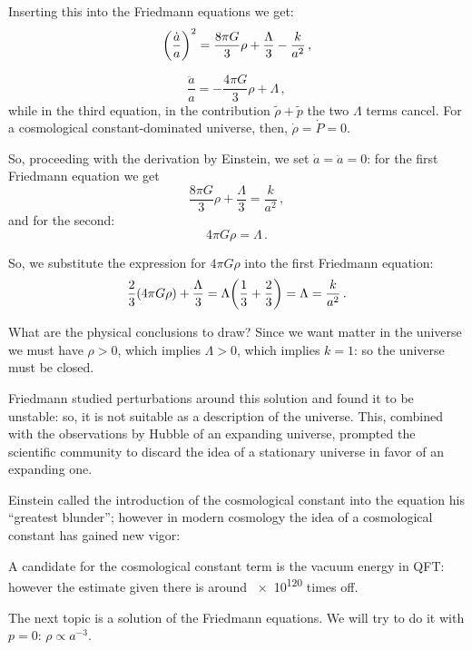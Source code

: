 \documentclass[main.tex]{subfiles}
\begin{document}
Inserting this into the Friedmann equations we get: 
%
\begin{equation}
  \qty(\frac{\dot{a} }{a})^2= 
  \frac{8 \pi G}{3} \rho + \frac{\Lambda }{3}
  - \frac{k}{a^2}
\,,
\end{equation}
%

%
\begin{equation}
  \frac{\ddot{a}}{a} = - \frac{4 \pi G}{3} \rho + \Lambda 
\,,
\end{equation}
%
while in the third equation, in the contribution \(\widetilde{\rho }  + \widetilde{p} \) the two \(\Lambda \) terms cancel. For a cosmological constant-dominated universe, then, \(\dot{\rho} = \dot{P} = 0\). 

So, proceeding with the derivation by Einstein, we set \(\dot{a}= \ddot{a} =0 \): for the first Friedmann equation we get 
%
\begin{equation}
  \frac{8 \pi G}{3} \rho + \frac{\Lambda}{3} = \frac{k}{a^2}
\,,
\end{equation}
%
and for the second: 
%
\begin{equation}
  4 \pi G \rho = \Lambda 
\,.
\end{equation}

So, we substitute the expression for \(4 \pi G \rho \) into the first Friedmann equation: 
%
\begin{equation}
  \frac{2}{3} \qty(4 \pi G \rho ) + \frac{\Lambda}{3} =
  \Lambda \qty(\frac{1}{3}+ \frac{2}{3}) = \Lambda = \frac{k}{a^2}
\,.
\end{equation}

What are the physical conclusions to draw? 
Since we want matter in the universe we must have \(\rho >0\), which implies \(\Lambda >0\), which implies \(k =1\): so the universe must be closed. 

Friedmann studied perturbations around this solution and found it to be unstable: so, it is not suitable as a description of the universe.
This, combined with the observations by Hubble of an expanding universe, prompted the scientific community to discard the idea of a stationary universe in favor of an expanding one.

Einstein called \cite{autInvestigatingLegendEinstein2018} the introduction of the cosmological constant into the equation his ``greatest blunder''; however in modern cosmology the idea of a cosmological constant has gained new vigor: 

A candidate for the cosmological constant term is the vacuum energy in QFT: however the estimate given there is around \num{e120} times off.

The next topic is a solution of the Friedmann equations.
We will try to do it with \(p=0\): \(\rho \propto a^{-3}\).
\end{document}
